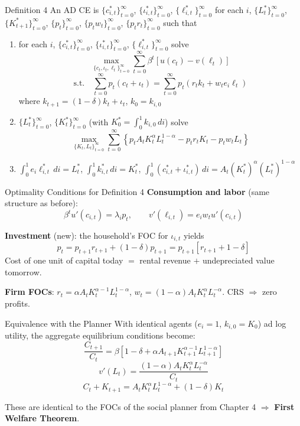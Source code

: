 \documentclass[blue]{beamer}
\begin{document}
\begin{frame}{Definition 4}
	\small
	An AD CE is $\{c_{i,t}^*\}_{t=0}^{\infty}$, $\{\iota_{i,t}^*\}_{t=0}^{\infty}$, $\{\ell_{i,t}^*\}_{t=0}^{\infty}$ for each $i$, $\{L_t^*\}_{t=0}^{\infty}$, $\{K_{t+1}^*\}_{t=0}^{\infty}$, $\{p_t\}_{t=0}^{\infty}$, $\{p_t w_t\}_{t=0}^{\infty}$, $\{p_t r_t\}_{t=0}^{\infty}$ such that
	
	\begin{enumerate}
		\item for each $i$, $\{c_{i,t}^*\}_{t=0}^{\infty}$, $\{\iota_{i,t}^*\}_{t=0}^{\infty}$, $\{\ell_{i,t}^*\}_{t=0}^{\infty}$ solve
		\[
		\max_{\{c_t, \iota_t, \ell_t\}_{t=0}^{\infty}} \sum_{t=0}^{\infty} \beta^t [u(c_t) - v(\ell_t)]
		\]
		 \[
		 \text{s.t.} \quad \sum_{t=0}^{\infty} p_t(c_t + \iota_t) = \sum_{t=0}^{\infty} p_t(r_t k_t + w_t e_i \ell_t)
		\]
		where $k_{t+1} = (1-\delta) k_t + \iota_t$, $k_0 = k_{i,0}$
		
		\item $\{L_t^*\}_{t=0}^{\infty}$, $\{K_t^*\}_{t=0}^{\infty}$ (with $K_0^* = \int_0^1 k_{i,0} \, di$) solve
		\[
		\max_{\{K_t, L_t\}_{t=0}^{\infty}} \sum_{t=0}^{\infty} \left\{ p_t A_t K_t^{\alpha} L_t^{1-\alpha} - p_t r_t K_t - p_t w_t L_t \right\}
		\]
		
		\item $\int_0^1 e_i \ell_{i,t}^* \, di = L_t^*$, $\int_0^1 k_{i,t}^* \, di = K_t^*$, $\int_0^1 (c_{i,t}^* + \iota_{i,t}^*) \, di = A_t (K_t^*)^{\alpha}(L_t^*)^{1-\alpha}$
	\end{enumerate}
\end{frame}

\begin{frame}{Optimality Conditions for Definition 4}
	\textbf{Consumption and labor} (same structure as before):
	\[
	\beta^t u'(c_{i,t}) = \lambda_i p_t, \qquad v'(\ell_{i,t}) = e_i w_t u'(c_{i,t})
	\]
	
	\textbf{Investment} (new): the household's FOC for $\iota_{i,t}$ yields
	\[
	p_t = p_{t+1} r_{t+1} + (1-\delta) p_{t+1} = p_{t+1}[r_{t+1} + 1 - \delta]
	\]
	Cost of one unit of capital today $=$ rental revenue $+$ undepreciated value tomorrow.
	
	\bigskip
	\textbf{Firm FOCs}: $r_t = \alpha A_t K_t^{\alpha-1} L_t^{1-\alpha}$, $w_t = (1-\alpha) A_t K_t^{\alpha} L_t^{-\alpha}$. CRS $\Rightarrow$ zero profits.
\end{frame}

\begin{frame}{Equivalence with the Planner}
	With identical agents ($e_i = 1$, $k_{i,0} = K_0$) ad log utility, the aggregate equilibrium conditions become:
	\[
	\frac{C_{t+1}}{C_t} = \beta[1 - \delta + \alpha A_{t+1} K_{t+1}^{\alpha-1} L_{t+1}^{1-\alpha}]
	\]
	\[
	v'(L_t) = \frac{(1-\alpha) A_t K_t^{\alpha} L_t^{-\alpha}}{C_t}
	\]
	\[
	C_t + K_{t+1} = A_t K_t^{\alpha} L_t^{1-\alpha} + (1-\delta) K_t
	\]
	
	These are identical to the FOCs of the social planner from Chapter 4 $\Rightarrow$ \textbf{First Welfare Theorem}.
\end{frame}
\end{document}

